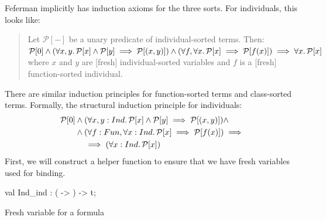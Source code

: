 \begin{node}
Feferman implicitly has induction axioms for the three sorts. For
individuals, this looks like:
\begin{quote}
Let $\mathcal{P}[-]$ be a unary predicate of individual-sorted
terms. Then: $\mathcal{P}[0]\land(\forall x,y\ldotp\mathcal{P}[x]\land\mathcal{P}[y]\implies\mathcal{P}[(x,y)])\land(\forall f,\forall x\ldotp\mathcal{P}[x]\implies\mathcal{P}[f(x)])\implies\forall x\ldotp\mathcal{P}[x]$ 
where $x$ and $y$ are [fresh] individual-sorted variables and $f$ is a [fresh]
function-sorted individual.
\end{quote}
There are similar induction principles for function-sorted terms and
class-sorted terms. Formally, the structural induction principle for individuals:
\begin{equation}
\begin{split}
\mathcal{P}[0]&\land(\forall x,y:Ind\ldotp\mathcal{P}[x]\land\mathcal{P}[y]\implies\mathcal{P}[(x,y)])\land\\
&\land(\forall f:Fun,\forall x:Ind\ldotp\mathcal{P}[x]\implies\mathcal{P}[f(x)])\implies\\
&\quad\implies(\forall x:Ind\ldotp\mathcal{P}[x])
\end{split}
\end{equation}
First, we will construct a helper function to ensure that we have
fresh variables used for binding.
\end{node}

\nwenddocs{}\plusendmoddef\nwstartdeflinemarkup{}\nwenddeflinemarkup
val Ind_ind : ( -> ) -> t;
\nwendcode{}\nwdocspar

\nwenddocs{}\plusendmoddef\nwstartdeflinemarkup{}\nwenddeflinemarkup
\LA{}Fresh variable for a formula~{\nwtagstyle{}}\RA{}

